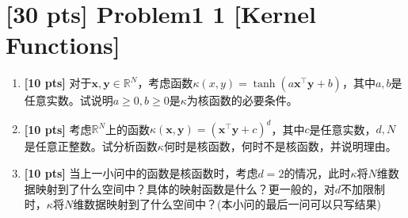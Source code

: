 \documentclass[a4paper,UTF8]{article}
\theoremstyle{definition}
\begin{document}
\newpage

\section*{\textbf{[30 pts]} Problem1 1 [Kernel Functions]}

\begin{enumerate}[(1)]
	\item \textbf{[10 pts]} 对于$\bm{x},\bm{y} \in \mathbb{R}^N$，考虑函数$\kappa(x,y) = \tanh( a \bm{x}^\top \bm{y} + b)$，其中$a,b$是任意实数。试说明$a \geq 0,b \geq 0$是$\kappa$为核函数的必要条件。
	\item \textbf{[10 pts]} 考虑$ \mathbb{R}^N $上的函数$ \kappa(\bm{x},\bm{y}) = (\bm{x}^\top \bm{y} + c)^d $，其中$c$是任意实数，$d,N$是任意正整数。试分析函数$\kappa$何时是核函数，何时不是核函数，并说明理由。
	\item \textbf{[10 pts]} 当上一小问中的函数是核函数时，考虑$d=2$的情况，此时$\kappa$将$N$维数据映射到了什么空间中？具体的映射函数是什么？更一般的，对$d$不加限制时，$\kappa$将$N$维数据映射到了什么空间中？(本小问的最后一问可以只写结果)
\end{enumerate}
\end{document}
